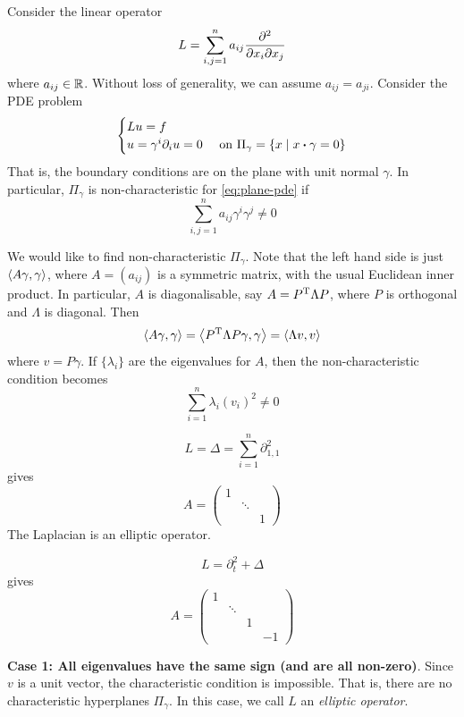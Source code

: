 \documentclass{article}
\begin{document}
Consider the linear operator
\[L = \sum_{i, j=  1}^n a_{ij}\pdv[2]{}{x_i}{x_j}\]
where \(a_{ij} \in \mathbb{R}\). Without loss of generality, we can assume \(a_{ij} = a_{ji}\). Consider the PDE problem
\begin{equation}
    \label{eq:plane-pde}
    \begin{cases}
        Lu = f & \\
        u = \gamma^i\partial_i u = 0 & \text{ on }\Pi_\gamma = \left\{x \mid x \vdot \gamma = 0\right\}
    \end{cases}
\end{equation}
That is, the boundary conditions are on the plane with unit normal \(\gamma\). In particular, \(\Pi_\gamma\) is non-characteristic for \cref{eq:plane-pde} if
\[\sum_{i, j= 1}^n a_{ij}\gamma^i\gamma^j \ne 0\]

We would like to find non-characteristic \(\Pi_\gamma\). Note that the left hand side is just \(\left\langle A\gamma, \gamma \right\rangle\), where \(A = (a_{ij})\) is a symmetric matrix, with the usual Euclidean inner product. In particular, \(A\) is diagonalisable, say \(A = P^{\mathrm{T}}\Lambda P\), where \(P\) is orthogonal and \(\Lambda\) is diagonal. Then
\[\left\langle A\gamma, \gamma \right\rangle = \left\langle P^{\mathrm{T}}\Lambda P\gamma, \gamma \right\rangle = \left\langle \Lambda v, v \right\rangle\]
where \(v = P\gamma\). If \(\{\lambda_i\}\) are the eigenvalues for \(A\), then the non-characteristic condition becomes
\[\sum_{i=1}^n \lambda_i(v_i)^2 \ne 0\]

\begin{example}
    [Laplacian]
    \[L = \Delta = \sum_{i=1}^n \partial^2_{1,1}\]
    gives
    \[A = \begin{pmatrix}
        1 \\
        &\ddots \\
        & & 1
    \end{pmatrix}\]
    The Laplacian is an elliptic operator.
\end{example}

\begin{example}
    \[L = \partial_t^2 + \Delta\]
    gives
    \[A = \begin{pmatrix}
        1 \\
        & \ddots \\
        && 1 \\
        &&&-1
    \end{pmatrix}\]
\end{example}

\textbf{Case 1: All eigenvalues have the same sign (and are all non-zero)}. Since \(v\) is a unit vector, the characteristic condition is impossible. That is, there are no characteristic hyperplanes \(\Pi_\gamma\). In this case, we call \(L\) an \emph{elliptic operator}.
\end{document}
